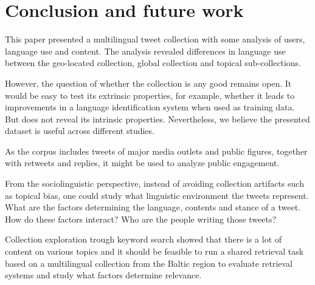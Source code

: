 \documentclass{IOS-Book-Article}
\begin{document}



\section{Conclusion and future work}
\label{sec:conclusion}


This paper presented a multilingual tweet collection with some analysis of users, language use and content. The analysis revealed differences in language use between the geo-located collection, global collection and topical sub-collections.

However, the question of whether the collection is any good remains open. It would be easy to test its extrinsic properties, for example, whether it leads to improvements in a language identification system when used as training data. But does not reveal its intrinsic properties. Nevertheless, we believe the presented dataset is useful across different studies.

As the corpus includes tweets of major media outlets and public figures, together with retweets and replies, it might be used to analyze public engagement.

From the sociolinguistic perspective, instead of avoiding collection artifacts such as topical bias, one could study what linguistic environment the tweets represent. What are the factors determining the language, contents and stance of a tweet. How do these factors interact? Who are the people writing those tweets?

Collection exploration trough keyword search showed that there is a lot of content on various topics and it should be feasible to run a shared retrieval task based on a multilingual collection from the Baltic region to evaluate retrieval systems and study what factors determine relevance.





\end{document}

